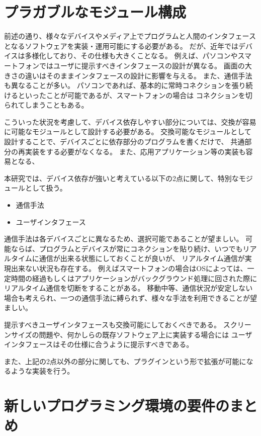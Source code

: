 \section{プラガブルなモジュール構成}\label{sec:plaggable-module-design}

前述の通り、様々なデバイスやメディア上でプログラムと人間のインタフェースとなるソフトウェアを実装・運用可能にする必要がある。
だが、近年ではデバイスは多様化しており、その仕様も大きくことなる。
例えば、パソコンやスマートフォンではユーザに提示すべきインタフェースの設計が異なる。
画面の大きさの違いはそのままインタフェースの設計に影響を与える。
また、通信手法も異なることが多い。
パソコンであれば、基本的に常時コネクションを張り続けるといったことが可能であるが、スマートフォンの場合は
コネクションを切られてしまうこともある。

こういった状況を考慮して、デバイス依存しやすい部分については、交換が容易に可能なモジュールとして設計する必要がある。
交換可能なモジュールとして設計することで、デバイスごとに依存部分のプログラムを書くだけで、
共通部分の再実装をする必要がなくなる。
また、応用アプリケーション等の実装も容易となる、

本研究では、デバイス依存が強いと考えている以下の2点に関して、特別なモジュールとして扱う。

\begin{itemize}
\itemsep1pt\parskip0pt
\item
  通信手法
\item
  ユーザインタフェース
\end{itemize}

通信手法は各デバイスごとに異なるため、選択可能であることが望ましい。
可能ならば、プログラムとデバイスが常にコネクションを貼り続け、いつでもリアルタイムに通信が出来る状態にしておくことが良いが、
リアルタイム通信が実現出来ない状況も存在する。
例えばスマートフォンの場合はOSによっては、一定時間の経過もしくはアプリケーションがバックグラウンド処理に回された際に
リアルタイム通信を切断をすることがある。
移動中等、通信状況が安定しない場合も考えられ、一つの通信手法に縛られず、様々な手法を利用できることが望ましい。

提示すべきユーザインタフェースも交換可能にしておくべきである。
スクリーンサイズの問題や、何かしらの既存ソフトウェア上に実装する場合には
ユーザインタフェースはその仕様に合うように提示すべきである。

また、上記の2点以外の部分に関しても、プラグインという形で拡張が可能になるような実装を行う。

\section{新しいプログラミング環境の要件のまとめ}\label{ux65b0ux3057ux3044ux30d7ux30edux30b0ux30e9ux30dfux30f3ux30b0ux74b0ux5883ux306eux8981ux4ef6ux306eux307eux3068ux3081}

